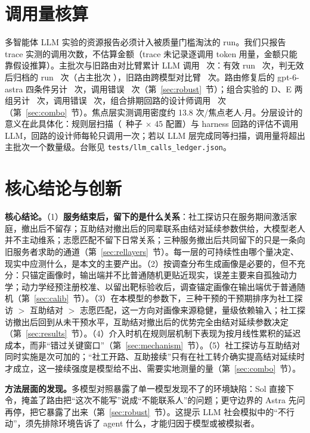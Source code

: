 \documentclass[10.5pt,twocolumn]{ctexart}
\begin{document}
\section{调用量核算}\label{sec:cost}
多智能体 LLM 实验的资源报告必须计入被质量门槛淘汰的 run。我们只报告 trace 实测的调用次数，不估算金额（trace 未记录逐调用 token 用量，金额只能靠假设推算）。主批次与旧路由对比臂累计 LLM 调用 \TotalCalls\ 次：有效 run \CallsValid\ 次，判无效后归档的 run \CallsWasted\ 次（占主批次 \WasteShare），旧路由跨模型对比臂 \CallsModelCompare\ 次。路由修复后的 gpt-6-astra 四条件另计 \CallsAstraRouter\ 次，调用错误 \ErrorsAstraRouter\ 次（第~\ref{sec:robust}~节）；组合实验的 D、E 两组另计 \CallsAstraCombo\ 次，调用错误 \ErrorsAstraCombo\ 次，组合排期回路的设计师调用 \CallsHarnessCombo\ 次（第~\ref{sec:combo}~节）。焦点层实测调用密度约 13.8 次/焦点老人$\cdot$月。分层设计的意义在此具体化：规则层扫描（\TimingSeeds\ 种子 $\times$ 45 配置）与 harness 回路的评估不调用 LLM，回路的设计师每轮只调用一次；若以 LLM 层完成同等扫描，调用量将超出主批次一个数量级。台账见 \texttt{tests/llm\_calls\_ledger.json}。

\section{核心结论与创新}\label{sec:core}
\textbf{核心结论。}（1）\textbf{服务结束后，留下的是什么关系}：社工探访只在服务期间激活家庭，撤出后不留存；互助结对撤出后的同辈联系由结对延续参数供给，大模型老人并不主动维系；志愿匹配不留下日常关系；三种服务撤出后共同留下的只是一条向旧服务者求助的通道（第~\ref{sec:rellayers}~节）。每一层的可持续性由哪个量决定、现实中应测什么，是本文的主要产出。（2）按调查分布生成画像是必要的，但不充分：只锚定画像时，输出端并不比普通随机更贴近现实，误差主要来自孤独动力学；动力学经预注册校准、以留出靶标验收后，调查锚定画像在输出端优于普通随机（第~\ref{sec:calib}~节）。（3）在本模型的参数下，三种干预的干预期排序为社工探访 $>$ 互助结对 $>$ 志愿匹配，这一方向对画像来源稳健，量级依赖输入；社工探访撤出后回到从未干预水平，互助结对撤出后的优势完全由结对延续参数决定（第~\ref{sec:results}~节）。（4）介入时机在规则层机制下表现为按月线性累积的延迟成本，而非``错过关键窗口''（第~\ref{sec:mechanism}~节）。（5）社工探访与互助结对同时实施是次可加的；``社工开路、互助接续''只有在社工转介确实提高结对延续时才成立，这一接续强度是模型给不出、需要实地测量的量（第~\ref{sec:combo}~节）。

\textbf{方法层面的发现。}多模型对照暴露了单一模型发现不了的环境缺陷：Sol 直接下令，掩盖了路由把``这次不能写''说成``不能联系人''的问题；更守边界的 Astra 先问再停，把它暴露了出来（第~\ref{sec:robust}~节）。这提示 LLM 社会模拟中的``不行动''，须先排除环境告诉了 agent 什么，才能归因于模型或被模拟者。
\end{document}

